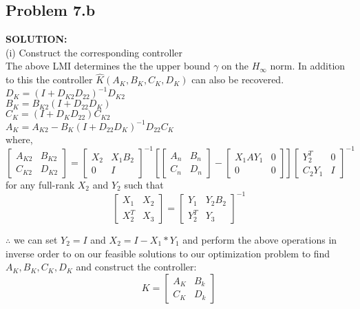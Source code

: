 \documentclass[10pt,a4paper]{article}
\begin{document}
\subsection{Problem 7.b}
\begin{tcolorbox}
\textbf{SOLUTION:}\\
(i) Construct the corresponding controller\\
The above LMI determines the the upper bound $\gamma$ on the $H_{\infty}$ norm. In addition to this the controller $\hat{K}(A_K,B_K,C_K,D_K)$ can also be recovered.\\
$ D_K=(I+D_{K2}D_{22})^{-1}D_{K2}$\\
$ B_K=B_{K2}(I+D_{22}D_K)$\\
$C_K=(I+D_{K}D_{22})C_{K2}$\\
$A_K=A_{K2}-B_K(I+D_{22}D_K)^{-1}D_{22}C_K$\\

where,
$\begin{bmatrix} A_{K2} & B_{K2} \\ C_{K2} & D_{K2} \end{bmatrix}= {\begin{bmatrix} X_{2} & X_{1}B_2 \\ 0 & I \end{bmatrix}}^{-1} \left[\begin{bmatrix} A_n & B_n \\ C_n & D_n \end{bmatrix}-\begin{bmatrix} X_1AY_1 & 0 \\ 0 & 0 \end{bmatrix}\right] {\begin{bmatrix} Y_2^T & 0 \\ C_2Y_1 & I \end{bmatrix}}^{-1}
$\\

for any full-rank $X_2$ and $Y_2$ such that\\
$$\begin{bmatrix} X_1 & X_2 \\ X_2^T & X_3 \end{bmatrix}= {\begin{bmatrix} Y_1 & Y_2 B_2 \\ Y_2^T & Y_3\end{bmatrix}}^{-1}
$$

$\therefore$ we can set $Y_2 = I$ and $X_2 = I-X_1*Y_1$ and perform the above operations in inverse order to on our feasible solutions to our optimization problem to find $A_K,B_K,C_K,D_K$ and construct the controller:
$$K=\begin{bmatrix}
A_K& B_k\\
C_K& D_k
\end{bmatrix}
$$



\end{tcolorbox}
\end{document}
